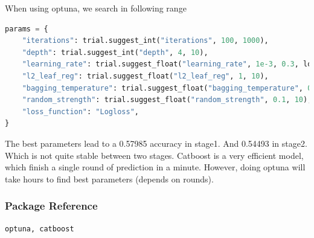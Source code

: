 \par When using optuna, we search in following range
\begin{lstlisting}[language=Python]
params = {
    "iterations": trial.suggest_int("iterations", 100, 1000),
    "depth": trial.suggest_int("depth", 4, 10),
    "learning_rate": trial.suggest_float("learning_rate", 1e-3, 0.3, log=True),
    "l2_leaf_reg": trial.suggest_float("l2_leaf_reg", 1, 10),
    "bagging_temperature": trial.suggest_float("bagging_temperature", 0, 1),
    "random_strength": trial.suggest_float("random_strength", 0.1, 10),
    "loss_function": "Logloss",
}
\end{lstlisting}
The best parameters lead to a 0.57985 accuracy in stage1. And 0.54493 in stage2. Which is not quite stable between two stages. Catboost is a very efficient model, which finish a single round of prediction in a minute. However, doing optuna will take hours to find best parameters (depends on rounds). 
\subsubsection*{Package Reference}
\begin{lstlisting}
optuna, catboost
\end{lstlisting}